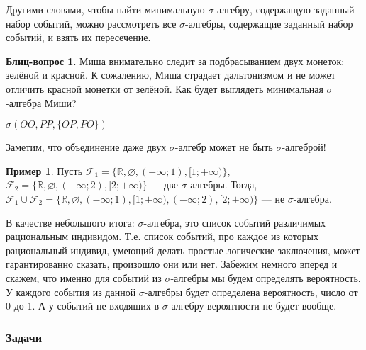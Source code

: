 \documentclass[pdftex, 12pt, a4paper]{article}
\def\s{\ensuremath{\sigma}}
\def \sg{\sigma}
\theoremstyle{definition} %
\newtheorem{myex}{Пример}
\numberwithin{problem}{section}
\newtheorem{blits}{Блиц-вопрос}
\numberwithin{blits}{section}
\begin{document}
Другими словами, чтобы найти минимальную $\sigma$-алгебру, содержащую заданный набор событий, можно рассмотреть все $\sigma$-алгебры, содержащие заданный набор событий, и взять их пересечение.

\begin{blits}
Миша внимательно следит за подбрасыванием двух монеток: зелёной и красной. К сожалению, Миша страдает дальтонизмом и не может отличить красной монетки от зелёной. Как будет выглядеть минимальная $\sigma$-алгебра Миши?
\begin{blitssol}
$\sg(OO,PP,\{OP,PO\})$
\end{blitssol}
\end{blits}

Заметим, что объединение даже двух $\sigma$-алгебр может не быть $\sigma$-алгеброй!

\begin{myex} Пусть $\mathcal{F}_{1}=\{\mathbb{R},\varnothing,(-\infty;1),[1;+\infty)\}$, $\mathcal{F}_{2}=\{\mathbb{R},\varnothing,(-\infty;2),[2;+\infty)\}$ --- две $\sigma$-алгебры. Тогда, $\mathcal{F}_{1}\cup \mathcal{F}_{2}=\{\mathbb{R},\varnothing,(-\infty;1),[1;+\infty),(-\infty;2),[2;+\infty)\}$ --- не $\sigma$-алгебра.
\end{myex}


В качестве небольшого итога: \s-алгебра, это список событий различимых рациональным индивидом. Т.е. список событий, про каждое из которых рациональный индивид, умеющий делать простые логические заключения, может гарантированно сказать, произошло они или нет. Забежим немного вперед и скажем, что именно для событий из \s-алгебры мы будем определять вероятность. У каждого события из данной \s-алгебры будет определена вероятность, число от 0 до 1. А у событий не входящих в \s-алгебру вероятности не будет вообще.


\subsubsection*{Задачи}
\end{document}
